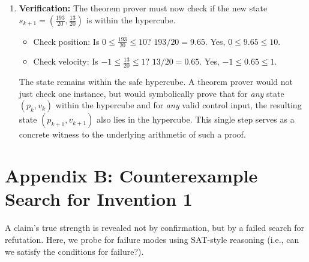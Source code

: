 \documentclass{article}
\begin{document}
\begin{enumerate}
    \item \textbf{Verification:} The theorem prover must now check if the new state $s_{k+1} = (\frac{193}{20}, \frac{13}{20})$ is within the hypercube.
    \begin{itemize}
        \item Check position: Is $0 \le \frac{193}{20} \le 10$?
          $193/20 = 9.65$. Yes, $0 \le 9.65 \le 10$.
        \item Check velocity: Is $-1 \le \frac{13}{20} \le 1$?
          $13/20 = 0.65$. Yes, $-1 \le 0.65 \le 1$.
    \end{itemize}
    The state remains within the safe hypercube. A theorem prover would not just check one instance, but would symbolically prove that for \textit{any} state $(p_k, v_k)$ within the hypercube and for \textit{any} valid control input, the resulting state $(p_{k+1}, v_{k+1})$ also lies in the hypercube. This single step serves as a concrete witness to the underlying arithmetic of such a proof.
\end{enumerate}

\section{Appendix B: Counterexample Search for Invention 1}

A claim's true strength is revealed not by confirmation, but by a failed search for refutation. Here, we probe for failure modes using SAT-style reasoning (i.e., can we satisfy the conditions for failure?).
\end{document}
